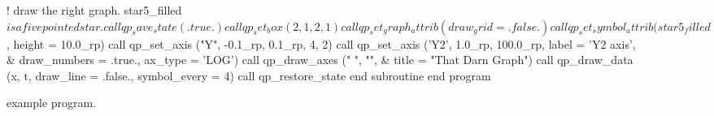 \begin{figure}
\begin{listing}{1}
  ! draw the right graph. star5_filled$ is a five pointed star.
    call qp_save_state (.true.)
    call qp_set_box (2, 1, 2, 1)
    call qp_set_graph_attrib (draw_grid = .false.)
    call qp_set_symbol_attrib (star5_filled$, height = 10.0_rp)
    call qp_set_axis ("Y", -0.1_rp, 0.1_rp, 4, 2)
    call qp_set_axis ('Y2', 1.0_rp, 100.0_rp, label = 'Y2 axis', &
                                draw_numbers = .true., ax_type = 'LOG')
    call qp_draw_axes ("      ", "\fsLY\fn", &
                                              title = "That Darn Graph")
    call qp_draw_data (x, t, draw_line = .false., symbol_every = 4)
    call qp_restore_state
  end subroutine
  end program
\end{listing}
\caption{\quickplot example program.}
\label{f:plot.example}
\end{figure}


